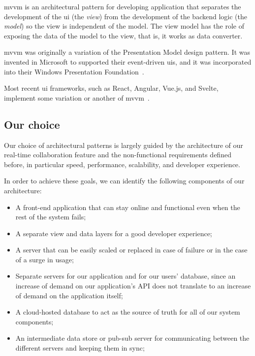 \acrfull{mvvm} is an architectural pattern for developing application that separates the development of the \acrfull{ui} (the \emph{view}) from the development of the backend logic (the \emph{model}) so the view is independent of the model.
The view model has the role of exposing the data of the model to the view, that is, it works as data converter.

\acrshort{mvvm} was originally a variation of the Presentation Model design pattern. It was invented in Microsoft to supported their event-driven \acrshort{ui}s, and it was incorporated into their Windows Presentation Foundation~\autocite{smith_patterns_2009}.

Most recent \acrshort{ui} frameworks, such as React, Angular, Vue.js, and Svelte, implement some variation or another of \acrshort{mvvm}~\autocite{noauthor_javascript_nodate}.

\subsection{Our choice}

Our choice of architectural patterns is largely guided by the architecture of our real-time collaboration feature and the non-functional requirements defined before, in particular speed, performance, scalability, and developer experience.

In order to achieve these goals, we can identify the following components of our architecture:

\begin{itemize}
	\item A front-end application that can stay online and functional even when the rest of the system fails;
	\item A separate view and data layers for a good developer experience;
	\item A server that can be easily scaled or replaced in case of failure or in the case of a surge in usage;
	\item Separate servers for our application and for our users' database, since an increase of demand on our application's API does not translate to an increase of demand on the application itself;
	\item A cloud-hosted database to act as the source of truth for all of our system components;
	\item An intermediate data store or pub-sub server for communicating between the different servers and keeping them in sync;
\end{itemize}


